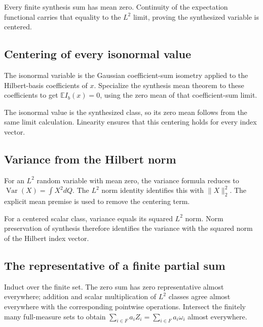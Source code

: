 \documentclass[11pt,a4paper]{report}
\begin{document}
Every finite synthesis sum has mean zero. Continuity of the expectation functional carries that equality to the \(L^2\) limit, proving the synthesized variable is centered.

\subsection{\texorpdfstring{Centering of every isonormal value}{Centering of every isonormal value}}
\label{report-step-UnadjustedLangevin-GaussianHilbert-lean-17}


The isonormal variable is the Gaussian coefficient-sum isometry applied to the Hilbert-basis coefficients of \(x\). Specialize the synthesis mean theorem to these coefficients to get \(\mathbb EI_b(x)=0\), using the zero mean of that coefficient-sum limit.



The isonormal value is the synthesized class, so its zero mean follows from the same limit calculation. Linearity ensures that this centering holds for every index vector.

\subsection{\texorpdfstring{Variance from the Hilbert norm}{Variance from the Hilbert norm}}
\label{report-step-UnadjustedLangevin-GaussianHilbert-lean-18}


For an \(L^2\) random variable with mean zero, the variance formula reduces to \(\operatorname{Var}(X)=\int X^2dQ\). The \(L^2\) norm identity identifies this with \(\|X\|_2^2\). The explicit mean premise is used to remove the centering term.



For a centered scalar class, variance equals its squared \(L^2\) norm. Norm preservation of synthesis therefore identifies the variance with the squared norm of the Hilbert index vector.

\subsection{\texorpdfstring{The representative of a finite partial sum}{The representative of a finite partial sum}}
\label{report-step-UnadjustedLangevin-GaussianHilbert-lean-19}


Induct over the finite set. The zero sum has zero representative almost everywhere; addition and scalar multiplication of \(L^2\) classes agree almost everywhere with the corresponding pointwise operations. Intersect the finitely many full-measure sets to obtain \(\sum_{i\in F}a_iZ_i=\sum_{i\in F}a_i\omega_i\) almost everywhere.
\end{document}
